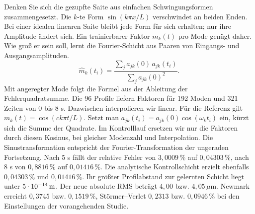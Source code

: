 Denken Sie sich die gezupfte Saite aus einfachen Schwingungsformen zusammengesetzt. Die \(k\)-te Form \(\sin(k\pi x/L)\) verschwindet an beiden Enden. Bei einer idealen linearen Saite bleibt jede Form für sich erhalten; nur ihre Amplitude ändert sich. Ein trainierbarer Faktor \(m_k(t)\) pro Mode genügt daher. Wie groß er sein soll, lernt die Fourier-Schicht aus Paaren von Eingangs- und Ausgangsamplituden.
\[
 \widehat m_k(t_i)=
 \frac{\sum_j a_{jk}(0)\,a_{jk}(t_i)}{\sum_j a_{jk}(0)^2}.
\]
Mit angeregter Mode folgt die Formel aus der Ableitung der Fehlerquadratsumme. Die 96 Profile liefern Faktoren für 192 Moden und 321 Zeiten von 0 bis 8 s. Dazwischen interpolieren wir linear. Für die Referenz gilt \(m_k(t)=\cos(ck\pi t/L)\). Setzt man \(a_{jk}(t_i)=a_{jk}(0)\cos(\omega_kt_i)\) ein, kürzt sich die Summe der Quadrate. Im Kontrolllauf ersetzen wir nur die Faktoren durch diesen Kosinus, bei gleicher Modenzahl und Interpolation. Die Sinustransformation entspricht der Fourier-Transformation der ungeraden Fortsetzung.
Nach 5 s fällt der relative Fehler von \(3{,}0009\,\%\) auf \(0{,}04303\,\%\), nach 8 s von \(0{,}8816\,\%\) auf \(0{,}01416\,\%\). Die analytische Kontrollschicht erzielt ebenfalls \(0{,}04303\,\%\) und \(0{,}01416\,\%\). Ihr größter Profilabstand zur gelernten Schicht liegt unter \(5\cdot10^{-14}\,\mathrm{m}\). Der neue absolute RMS beträgt \(4{,}00\) bzw. \(4{,}05\,\mu\mathrm m\). Newmark erreicht \(0{,}3745\) bzw. \(0{,}1519\,\%\), Störmer--Verlet \(0{,}2313\) bzw. \(0{,}0946\,\%\) bei den Einstellungen der vorangehenden Studie.

